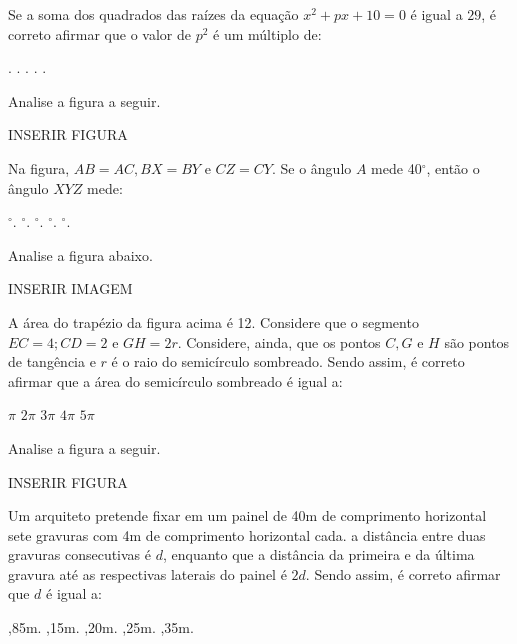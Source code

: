 \begin{question}%
Se a soma dos quadrados das raízes da equação \(x^2 + px + 10 = 0\) é igual a \(29\), é correto afirmar que o valor de \(p^2\) é um múltiplo de:
    \begin{tasks}
        .
        .
        .
        .
        .
    \end{tasks}
\end{question}

\begin{question}%
Analise a figura a seguir.

INSERIR FIGURA

Na figura, \(AB = AC, BX=BY\) e \(CZ=CY\). Se o ângulo \(A\) mede 40\(^\circ\), então o ângulo \(XYZ\) mede:
    \begin{tasks}
        \(^\circ\).
        \(^\circ\).
        \(^\circ\).
        \(^\circ\).
        \(^\circ\).
    \end{tasks}
\end{question}

\begin{question}%
Analise a figura abaixo.

INSERIR IMAGEM

A área do trapézio da figura acima é 12. Considere que o segmento \(EC = 4; CD = 2\) e \(GH = 2r\). Considere, ainda, que os pontos \(C,G\) e \(H\) são pontos de tangência e \(r\) é o raio do semicírculo sombreado. Sendo assim, é correto afirmar que a área do semicírculo sombreado é igual a:
    \begin{tasks}
        \task \(\pi\)
        \task \(2\pi\)
        \task \(3\pi\)
        \task \(4\pi\)
        \task \(5\pi\)
    \end{tasks}
\end{question}

\begin{question}%
Analise a figura a seguir.

INSERIR FIGURA

Um arquiteto pretende fixar em um painel de 40m de comprimento horizontal sete gravuras com 4m de comprimento horizontal cada. a distância entre duas gravuras consecutivas é \(d\), enquanto que a distância da primeira e da última gravura até as respectivas laterais do painel é \(2d\). Sendo assim, é correto afirmar que \(d\) é igual a:
    \begin{tasks}
        ,85m.
        ,15m.
        ,20m.
        ,25m.
        ,35m.
    \end{tasks}
\end{question}

